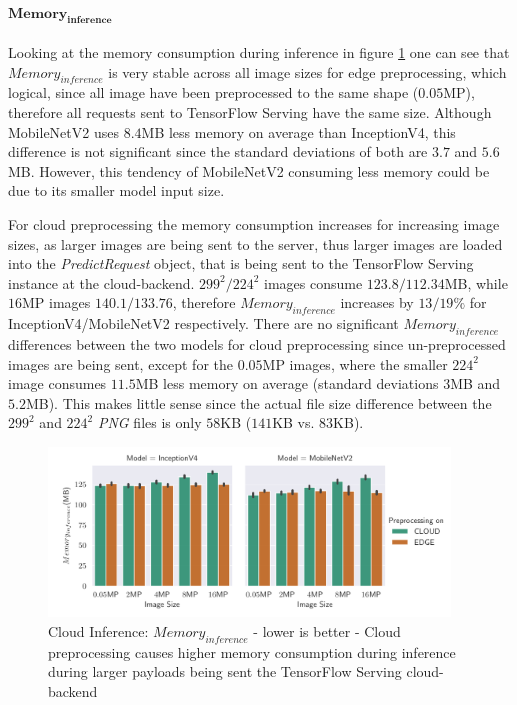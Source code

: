 \paragraph{$\mathbf{Memory_{inference}}$}
Looking at the memory consumption during inference in figure \ref{fig:cloudInferenceInferenceMemory} one can see that $Memory_{inference}$ is very stable across all image sizes for edge preprocessing, which logical, since all image have been preprocessed to the same shape ($0.05$MP), therefore all requests sent to TensorFlow Serving have the same size.
Although MobileNetV2 uses $8.4$MB less memory on average than InceptionV4, this difference is not significant since the standard deviations of both are $3.7$ and $5.6$MB.
However, this tendency of MobileNetV2 consuming less memory could be due to its smaller model input size.

For cloud preprocessing the memory consumption increases for increasing image sizes, as larger images are being sent to the server, thus larger images are loaded into the \emph{PredictRequest} object, that is being sent to the  TensorFlow Serving instance at the cloud-backend.
$299^2/224^2$ images consume $123.8/112.34$MB, while $16$MP images $140.1/133.76$, therefore $Memory_{inference}$ increases by $13/19\%$ for InceptionV4/MobileNetV2 respectively.
There are no significant $Memory_{inference}$  differences between the two models for cloud preprocessing since un-preprocessed images are being sent, except for the $0.05$MP images, where the smaller $224^2$ image consumes $11.5$MB less memory on average (standard deviations $3$MB and $5.2$MB).
This makes little sense since the actual file size difference between the $299^2$ and $224^2$ \emph{PNG} files is only $58$KB ($141$KB vs. $83$KB).
\begin{figure}[!htb]
\centering
\includegraphics[width=0.95\textwidth]{./Bilder/single_plots/cloud_inference_plots/Cloud_Inference_Memory.pdf}
\caption[Cloud Inference:  $Memory_{inference}$ - lower is better]{Cloud Inference:  $Memory_{inference}$ - lower is better - Cloud preprocessing causes higher memory consumption during inference during larger payloads being sent the TensorFlow Serving cloud-backend}
\label{fig:cloudInferenceInferenceMemory}
\end{figure}
